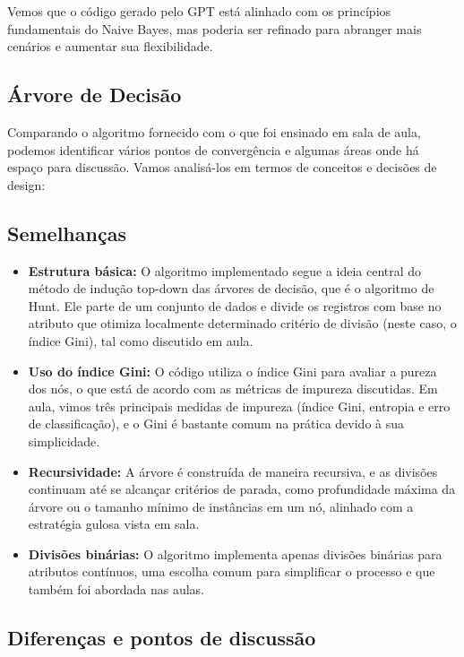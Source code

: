 \documentclass[12pt]{article}
\begin{document}
Vemos que o código gerado pelo GPT está alinhado com os princípios fundamentais do Naive Bayes, mas poderia ser refinado para abranger mais cenários e aumentar sua flexibilidade.

\subsection{Árvore de Decisão}

Comparando o algoritmo fornecido com o que foi ensinado em sala de aula, podemos identificar vários pontos de convergência e algumas áreas onde há espaço para discussão. Vamos analisá-los em termos de conceitos e decisões de design:

\subsection*{Semelhanças}

\begin{itemize}
    \item \textbf{Estrutura básica:} O algoritmo implementado segue a ideia central do método de indução top-down das árvores de decisão, que é o algoritmo de Hunt. Ele parte de um conjunto de dados e divide os registros com base no atributo que otimiza localmente determinado critério de divisão (neste caso, o índice Gini), tal como discutido em aula.
    
    \item \textbf{Uso do índice Gini:} O código utiliza o índice Gini para avaliar a pureza dos nós, o que está de acordo com as métricas de impureza discutidas. Em aula, vimos três principais medidas de impureza (índice Gini, entropia e erro de classificação), e o Gini é bastante comum na prática devido à sua simplicidade.
    
    \item \textbf{Recursividade:} A árvore é construída de maneira recursiva, e as divisões continuam até se alcançar critérios de parada, como profundidade máxima da árvore ou o tamanho mínimo de instâncias em um nó, alinhado com a estratégia gulosa vista em sala.
    
    \item \textbf{Divisões binárias:} O algoritmo implementa apenas divisões binárias para atributos contínuos, uma escolha comum para simplificar o processo e que também foi abordada nas aulas.
\end{itemize}

\subsection*{Diferenças e pontos de discussão}
\end{document}
